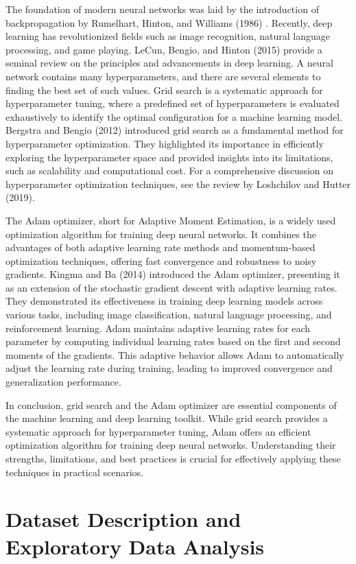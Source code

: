 \documentclass[conference]{IEEEtran}
\begin{document}
The foundation of modern neural networks was laid by the introduction of backpropagation by Rumelhart, Hinton, and Williams (1986) . Recently, deep learning has revolutionized fields such as image recognition, natural language processing, and game playing. LeCun, Bengio, and Hinton (2015) provide a seminal review on the principles and advancements in deep learning. A neural network contains many hyperparameters, and there are several elements to finding the best set of such values. Grid search is a systematic approach for hyperparameter tuning, where a predefined set of hyperparameters is evaluated exhaustively to identify the optimal configuration for a machine learning model. Bergstra and Bengio (2012) introduced grid search as a fundamental method for hyperparameter optimization. They highlighted its importance in efficiently exploring the hyperparameter space and provided insights into its limitations, such as scalability and computational cost. For a comprehensive discussion on hyperparameter optimization techniques, see the review by Loshchilov and Hutter (2019).

The Adam optimizer, short for Adaptive Moment Estimation, is a widely used optimization algorithm for training deep neural networks. It combines the advantages of both adaptive learning rate methods and momentum-based optimization techniques, offering fast convergence and robustness to noisy gradients. Kingma and Ba (2014) introduced the Adam optimizer, presenting it as an extension of the stochastic gradient descent with adaptive learning rates. They demonstrated its effectiveness in training deep learning models across various tasks, including image classification, natural language processing, and reinforcement learning. Adam maintains adaptive learning rates for each parameter by computing individual learning rates based on the first and second moments of the gradients. This adaptive behavior allows Adam to automatically adjust the learning rate during training, leading to improved convergence and generalization performance.

In conclusion, grid search and the Adam optimizer are essential components of the machine learning and deep learning toolkit. While grid search provides a systematic approach for hyperparameter tuning, Adam offers an efficient optimization algorithm for training deep neural networks. Understanding their strengths, limitations, and best practices is crucial for effectively applying these techniques in practical scenarios.


\section{Dataset Description and Exploratory Data Analysis}
\end{document}
